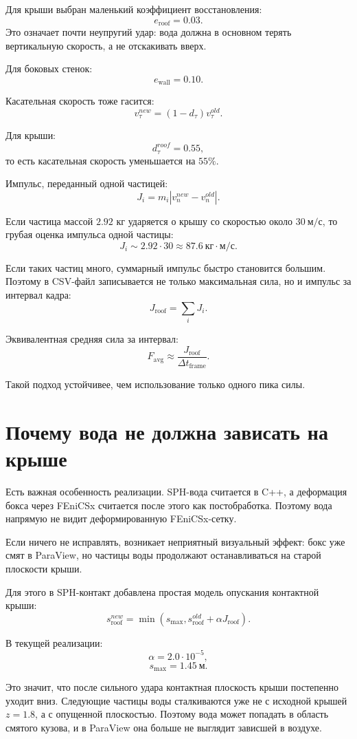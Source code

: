 \documentclass[12pt,a4paper]{article}
\begin{document}
Для крыши выбран маленький коэффициент восстановления:
\[
e_{\text{roof}} = 0.03.
\]
Это означает почти неупругий удар: вода должна в основном терять вертикальную
скорость, а не отскакивать вверх.

Для боковых стенок:
\[
e_{\text{wall}} = 0.10.
\]

Касательная скорость тоже гасится:
\[
v_{\tau}^{new} = (1-d_{\tau})v_{\tau}^{old}.
\]

Для крыши:
\[
d_{\tau}^{roof}=0.55,
\]
то есть касательная скорость уменьшается на \(55\%\).

Импульс, переданный одной частицей:
\[
J_i = m_i |v_n^{new}-v_n^{old}|.
\]

Если частица массой \(2.92\) кг ударяется о крышу со скоростью около
\(30\ \text{м}/\text{с}\), то грубая оценка импульса одной частицы:
\[
J_i \sim 2.92 \cdot 30
\approx 87.6 \ \text{кг}\cdot\text{м}/\text{с}.
\]

Если таких частиц много, суммарный импульс быстро становится большим.
Поэтому в CSV-файл записывается не только максимальная сила, но и импульс за
интервал кадра:
\[
J_{\text{roof}} = \sum_i J_i.
\]

Эквивалентная средняя сила за интервал:
\[
F_{\text{avg}} \approx \frac{J_{\text{roof}}}{\Delta t_{\text{frame}}}.
\]

Такой подход устойчивее, чем использование только одного пика силы.

\section{Почему вода не должна зависать на крыше}

Есть важная особенность реализации. SPH-вода считается в C++, а деформация бокса
через FEniCSx считается после этого как постобработка. Поэтому вода напрямую не
видит деформированную FEniCSx-сетку.

Если ничего не исправлять, возникает неприятный визуальный эффект: бокс уже
смят в ParaView, но частицы воды продолжают останавливаться на старой плоскости
крыши.

Для этого в SPH-контакт добавлена простая модель опускания контактной крыши:
\[
s_{\text{roof}}^{new}
=
\min(s_{\max}, s_{\text{roof}}^{old} + \alpha J_{\text{roof}}).
\]

В текущей реализации:
\[
\alpha = 2.0\cdot 10^{-5},
\]
\[
s_{\max}=1.45 \ \text{м}.
\]

Это значит, что после сильного удара контактная плоскость крыши постепенно
уходит вниз. Следующие частицы воды сталкиваются уже не с исходной крышей
\(z=1.8\), а с опущенной плоскостью. Поэтому вода может попадать в область
смятого кузова, и в ParaView она больше не выглядит зависшей в воздухе.
\end{document}
